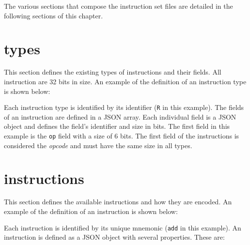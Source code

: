 \documentclass[11pt,a4paper,twoside,titlepage]{report}
\begin{document}


The various sections that compose the instruction set files are detailed in 
the following sections of this chapter.


\section{types}

This section defines the existing types of instructions and their fields.
All instruction are 32 bits in size.
An example of the definition of an instruction type is shown below:



Each instruction type is identified by its identifier (\verb+R+ in this example).
The fields of an instruction are defined in a JSON array. Each individual field is 
a JSON object and defines the field's identifier and size in bits. The first field
in this example is the \verb+op+ field with a size of 6 bits.
The first field of the instructions is considered the \emph{opcode} and must
have the same size in all types.


\section{instructions}

This section defines the available instructions and how they are encoded.
An example of the definition of an instruction is shown below:



Each instruction is identified by its unique mnemonic (\verb+add+ in this example).
An instruction is defined as a JSON object with several properties. These are:
\end{document}

